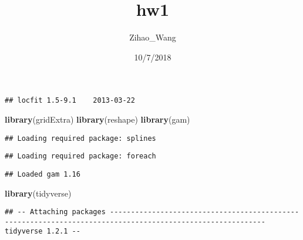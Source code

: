 \documentclass[]{article}
\title{hw1}
\author{Zihao\_Wang}
\date{10/7/2018}
\newenvironment{Shaded}{\begin{snugshade}}{\end{snugshade}}
\newcommand{\KeywordTok}[1]{\textcolor[rgb]{0.13,0.29,0.53}{\textbf{#1}}}
\newcommand{\DataTypeTok}[1]{\textcolor[rgb]{0.13,0.29,0.53}{#1}}
\newcommand{\DecValTok}[1]{\textcolor[rgb]{0.00,0.00,0.81}{#1}}
\newcommand{\StringTok}[1]{\textcolor[rgb]{0.31,0.60,0.02}{#1}}
\newcommand{\OperatorTok}[1]{\textcolor[rgb]{0.81,0.36,0.00}{\textbf{#1}}}
\newcommand{\NormalTok}[1]{#1}
\begin{document}
\maketitle

\begin{Shaded}
\end{Shaded}

\begin{verbatim}
## locfit 1.5-9.1    2013-03-22
\end{verbatim}

\begin{Shaded}
\begin{Highlighting}[]
\KeywordTok{library}\NormalTok{(gridExtra)}
\KeywordTok{library}\NormalTok{(reshape)}
\KeywordTok{library}\NormalTok{(gam)}
\end{Highlighting}
\end{Shaded}

\begin{verbatim}
## Loading required package: splines
\end{verbatim}

\begin{verbatim}
## Loading required package: foreach
\end{verbatim}

\begin{verbatim}
## Loaded gam 1.16
\end{verbatim}

\begin{Shaded}
\begin{Highlighting}[]
\KeywordTok{library}\NormalTok{(tidyverse)}
\end{Highlighting}
\end{Shaded}

\begin{verbatim}
## -- Attaching packages ----------------------------------------------------------------------------------------------------------- tidyverse 1.2.1 --
\end{verbatim}
\end{document}
